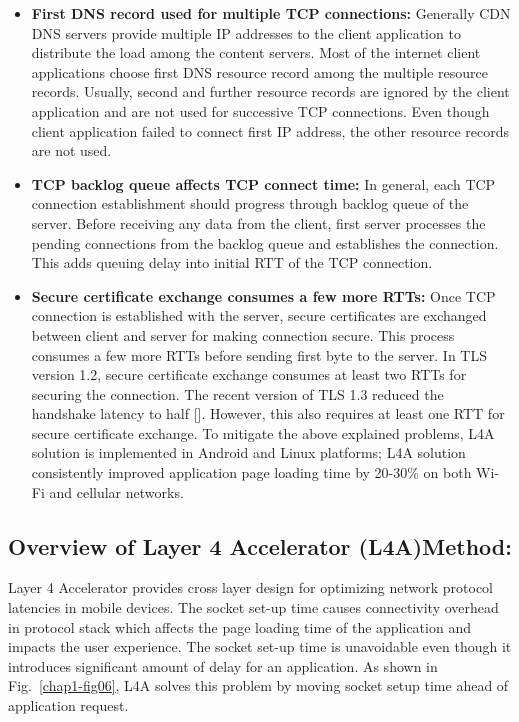 \begin{multicols}{2}
{\begin{itemize}
\item{\bf First DNS record used for multiple TCP connections:} Generally CDN DNS servers provide multiple IP addresses to the client application to distribute the load among the content servers. Most of the internet client applications choose first DNS resource record among the multiple resource records. Usually, second and further resource records are ignored by the client application and are not used for successive TCP connections. Even though client application failed to connect first IP address, the other resource records are not used.
\item{\bf TCP backlog queue affects TCP connect time:} In general, each TCP connection establishment should progress through backlog queue of the server. Before receiving any data from the client, first server processes the pending connections from the backlog queue and establishes the connection. This adds queuing delay into initial RTT of the TCP connection.
\item{\bf Secure certificate exchange consumes a few more RTTs:} Once TCP connection is established with the server, secure certificates are exchanged between client and server for making connection secure. This process consumes a few more RTTs before sending first byte to the server. In TLS version 1.2, secure certificate exchange consumes at least two RTTs for securing the connection. The recent version of TLS 1.3 reduced the handshake latency to half [\cite{art1-key17}]. However, this also requires at least one RTT for secure certificate exchange. To mitigate the above explained problems, L4A solution is implemented in Android and Linux platforms; L4A solution consistently improved application page loading time by 20-30\% on both Wi-Fi and cellular networks.
\end{itemize}


\subsection{Overview of Layer 4 Accelerator (L4A)Method:}

Layer 4 Accelerator provides cross layer design for optimizing network protocol latencies in mobile devices. The socket set-up time causes connectivity overhead in protocol stack which affects the page loading time of the application and impacts the user experience. The socket set-up time is unavoidable even though it introduces significant amount of delay for an application. As shown in Fig.~\ref{chap1-fig06}, L4A solves this problem by moving socket setup time ahead of application request.

}
\end{multicols}

